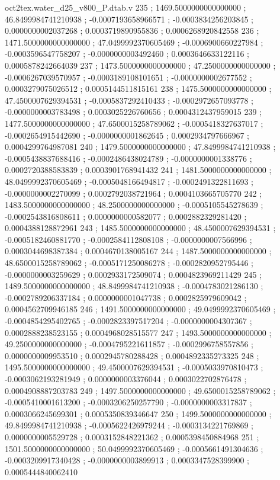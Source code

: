 \begin{filecontents}[overwrite]{oct2tex.water_d25_v800_P.dtab.v}
235 ; 1469.5000000000000000 ; 46.8499984741210938 ; -0.0007193658966571 ; -0.0003834256203845 ; 0.0000000002037268 ; 0.0003719890955836 ; 0.0006268920842558
236 ; 1471.5000000000000000 ; 47.0499992370605469 ; -0.0006900660227984 ; -0.0003596547758207 ; -0.0000000003492460 ; 0.0003646633122116 ; 0.0005878242664039
237 ; 1473.5000000000000000 ; 47.2500000000000000 ; -0.0006267039570957 ; -0.0003189108101651 ; -0.0000000002677552 ; 0.0003279075026512 ; 0.0005144511815161
238 ; 1475.5000000000000000 ; 47.4500007629394531 ; -0.0005837292410433 ; -0.0002972657093778 ; -0.0000000003783498 ; 0.0003025226760656 ; 0.0004312437959015
239 ; 1477.5000000000000000 ; 47.6500015258789062 ; -0.0005418327637017 ; -0.0002654915442690 ; -0.0000000001862645 ; 0.0002934797666967 ; 0.0004299764987081
240 ; 1479.5000000000000000 ; 47.8499984741210938 ; -0.0005438837688416 ; -0.0002486438024789 ; -0.0000000001338776 ; 0.0002720388583839 ; 0.0003901768941432
241 ; 1481.5000000000000000 ; 48.0499992370605469 ; -0.0005048166494817 ; -0.0002491322811693 ; -0.0000000002270099 ; 0.0002792038721964 ; 0.0004103665705770
242 ; 1483.5000000000000000 ; 48.2500000000000000 ; -0.0005105545278639 ; -0.0002543816808611 ; 0.0000000000582077 ; 0.0002882329281420 ; 0.0004388128872961
243 ; 1485.5000000000000000 ; 48.4500007629394531 ; -0.0005182460881770 ; -0.0002584112808108 ; -0.0000000007566996 ; 0.0003044698387384 ; 0.0004670138005167
244 ; 1487.5000000000000000 ; 48.6500015258789062 ; -0.0005171250086278 ; -0.0002820952795446 ; -0.0000000003259629 ; 0.0002933172509074 ; 0.0004823969211429
245 ; 1489.5000000000000000 ; 48.8499984741210938 ; -0.0004783021286130 ; -0.0002789206337184 ; 0.0000000001047738 ; 0.0002825979609042 ; 0.0004562709946185
246 ; 1491.5000000000000000 ; 49.0499992370605469 ; -0.0004854295402765 ; -0.0002823397517204 ; -0.0000000004307367 ; 0.0002888238523155 ; 0.0004968028515577
247 ; 1493.5000000000000000 ; 49.2500000000000000 ; -0.0004795221611857 ; -0.0002996758557856 ; 0.0000000009953510 ; 0.0002945780288428 ; 0.0004892335273325
248 ; 1495.5000000000000000 ; 49.4500007629394531 ; -0.0005033970810473 ; -0.0003062193281949 ; 0.0000000003376044 ; 0.0003022702876478 ; 0.0004908887203783
249 ; 1497.5000000000000000 ; 49.6500015258789062 ; -0.0005410001613200 ; -0.0003206250257790 ; -0.0000000003317837 ; 0.0003066245699301 ; 0.0005350839346647
250 ; 1499.5000000000000000 ; 49.8499984741210938 ; -0.0005622426979244 ; -0.0003134221769869 ; 0.0000000005529728 ; 0.0003152848221362 ; 0.0005398450884968
251 ; 1501.5000000000000000 ; 50.0499992370605469 ; -0.0005661491304636 ; -0.0003209917340428 ; -0.0000000003899913 ; 0.0003347528399900 ; 0.0005444840062410

\end{filecontents}
